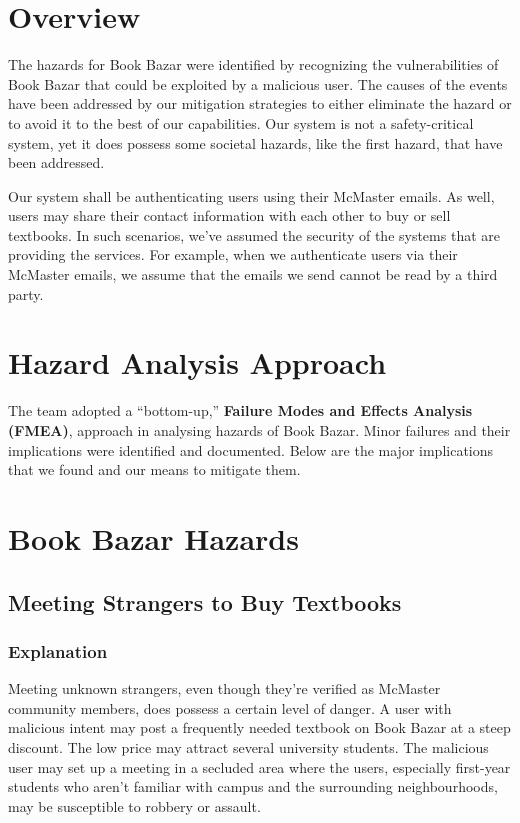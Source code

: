 \documentclass[fullpage]{article}
\begin{document}
\section{Overview}

The hazards for Book Bazar were identified by recognizing the vulnerabilities of Book Bazar that could be exploited by a malicious user. The causes of the events have been addressed by our mitigation strategies to either eliminate the hazard or to avoid it to the best of our capabilities. Our system is not a safety-critical system, yet it does possess some societal hazards, like the first hazard, that have been addressed.

Our system shall be authenticating users using their McMaster emails. As well, users may share their contact information with each other to buy or sell textbooks. In such scenarios, we've assumed the security of the systems that are providing the services. For example, when we authenticate users via their McMaster emails, we assume that the emails we send cannot be read by a third party.

\section{Hazard Analysis Approach}
The team adopted a ``bottom-up,'' \textbf{Failure Modes and Effects Analysis (FMEA)}, approach in analysing hazards of Book Bazar.
Minor failures and their implications were identified and documented.
Below are the major implications that we found and our means to mitigate them.

\section{Book Bazar Hazards}

\subsection{Meeting Strangers to Buy Textbooks}
\subsubsection*{Explanation}
Meeting unknown strangers, even though they're verified as McMaster community members, does possess a certain level of danger. A user with malicious intent may post a frequently needed textbook on Book Bazar at a steep discount. The low price may attract several university students. The malicious user may set up a meeting in a secluded area where the users, especially first-year students who aren't familiar with campus and the surrounding neighbourhoods, may be susceptible to robbery or assault.
\end{document}
